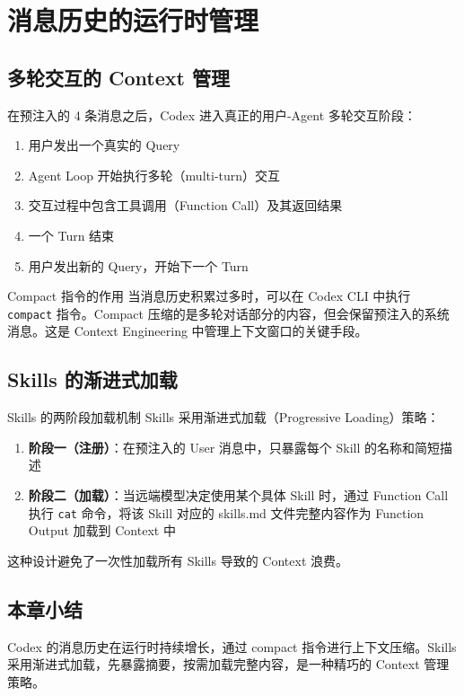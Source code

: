 \section{消息历史的运行时管理}

\subsection{多轮交互的 Context 管理}

在预注入的 4 条消息之后，Codex 进入真正的用户-Agent 多轮交互阶段：

\begin{enumerate}
    \item 用户发出一个真实的 Query
    \item Agent Loop 开始执行多轮（multi-turn）交互
    \item 交互过程中包含工具调用（Function Call）及其返回结果
    \item 一个 Turn 结束
    \item 用户发出新的 Query，开始下一个 Turn
\end{enumerate}

\begin{importantbox}{Compact 指令的作用}
当消息历史积累过多时，可以在 Codex CLI 中执行 \texttt{compact} 指令。Compact 压缩的是多轮对话部分的内容，但会保留预注入的系统消息。这是 Context Engineering 中管理上下文窗口的关键手段。
\end{importantbox}

\subsection{Skills 的渐进式加载}

\begin{knowledgebox}{Skills 的两阶段加载机制}
Skills 采用渐进式加载（Progressive Loading）策略：
\begin{enumerate}
    \item \textbf{阶段一（注册）}：在预注入的 User 消息中，只暴露每个 Skill 的名称和简短描述
    \item \textbf{阶段二（加载）}：当远端模型决定使用某个具体 Skill 时，通过 Function Call 执行 \texttt{cat} 命令，将该 Skill 对应的 skills.md 文件完整内容作为 Function Output 加载到 Context 中
\end{enumerate}
这种设计避免了一次性加载所有 Skills 导致的 Context 浪费。
\end{knowledgebox}

\subsection{本章小结}

Codex 的消息历史在运行时持续增长，通过 compact 指令进行上下文压缩。Skills 采用渐进式加载，先暴露摘要，按需加载完整内容，是一种精巧的 Context 管理策略。


